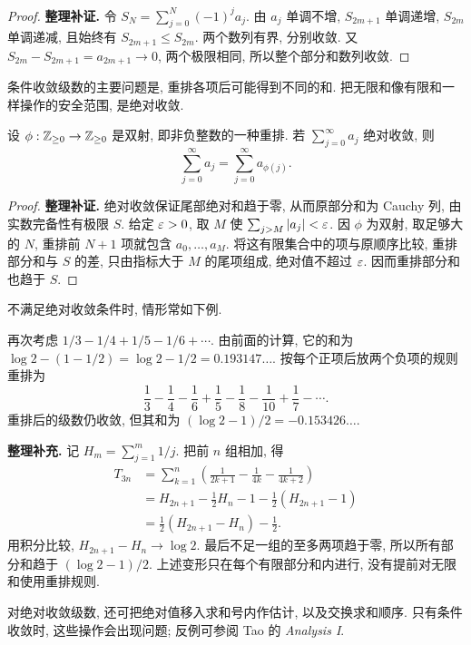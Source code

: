 \begin{proof}
\textbf{整理补证.} 令 $S_N=\sum_{j=0}^{N}(-1)^ja_j$. 由 $a_j$ 单调不增, $S_{2m+1}$ 单调递增, $S_{2m}$ 单调递减, 且始终有 $S_{2m+1}\leq S_{2m}$. 两个数列有界, 分别收敛. 又 $S_{2m}-S_{2m+1}=a_{2m+1}\to0$, 两个极限相同, 所以整个部分和数列收敛.
\end{proof}

条件收敛级数的主要问题是, 重排各项后可能得到不同的和. 把无限和像有限和一样操作的安全范围, 是绝对收敛.

\begin{theorem}\label{thm:rearrangement}
设 $\phi:\mathbb Z_{\geq0}\to\mathbb Z_{\geq0}$ 是双射, 即非负整数的一种重排. 若 $\sum_{j=0}^{\infty}a_j$ 绝对收敛, 则
\[
\sum_{j=0}^{\infty}a_j=\sum_{j=0}^{\infty}a_{\phi(j)}.
\]
\end{theorem}

\begin{proof}
\textbf{整理补证.} 绝对收敛保证尾部绝对和趋于零, 从而原部分和为 Cauchy 列, 由实数完备性有极限 $S$. 给定 $\varepsilon>0$, 取 $M$ 使 $\sum_{j>M}|a_j|<\varepsilon$. 因 $\phi$ 为双射, 取足够大的 $N$, 重排前 $N+1$ 项就包含 $a_0,\ldots,a_M$. 将这有限集合中的项与原顺序比较, 重排部分和与 $S$ 的差, 只由指标大于 $M$ 的尾项组成, 绝对值不超过 $\varepsilon$. 因而重排部分和也趋于 $S$.
\end{proof}

不满足绝对收敛条件时, 情形常如下例.

\begin{example}\label{ex:rearrange-harmonic}
再次考虑 $1/3-1/4+1/5-1/6+\cdots$. 由前面的计算, 它的和为 $\log2-(1-1/2)=\log2-1/2=0.193147\ldots$. 按每个正项后放两个负项的规则重排为
\[
\frac13-\frac14-\frac16+\frac15-\frac18-\frac1{10}+\frac17-\cdots.
\]
重排后的级数仍收敛, 但其和为 $(\log2-1)/2=-0.153426\ldots$.
\end{example}
\begin{solution}
\textbf{整理补充.} 记 $H_m=\sum_{j=1}^{m}1/j$. 把前 $n$ 组相加, 得
\begin{align*}
T_{3n}
&=\sum_{k=1}^{n}\left(\frac1{2k+1}-\frac1{4k}-\frac1{4k+2}\right)\\
&=H_{2n+1}-\frac12H_n-1-\frac12(H_{2n+1}-1)\\
&=\frac12(H_{2n+1}-H_n)-\frac12.
\end{align*}
用积分比较, $H_{2n+1}-H_n\to\log2$. 最后不足一组的至多两项趋于零, 所以所有部分和趋于 $(\log2-1)/2$. 上述变形只在每个有限部分和内进行, 没有提前对无限和使用重排规则.
\end{solution}

对绝对收敛级数, 还可把绝对值移入求和号内作估计, 以及交换求和顺序. 只有条件收敛时, 这些操作会出现问题; 反例可参阅 Tao 的 \textit{Analysis I}.

